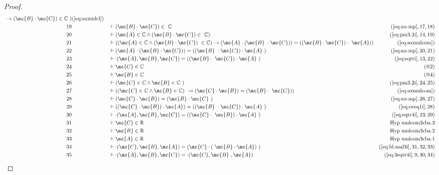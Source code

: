 \begin{proof}
\begin{align}
     ~\rightarrow ( \mc{B} \cdot \mc{C} ) \in \mathbb{C}
     ~)&(\mbox{\ref{eq:axmulcl}})\notag
  \\ 19 &&  & \vdash ( \mc{B} \cdot \mc{C} ) \in
     ~\mathbb{C}&(\mbox{\ref{eq:ax-mp}},17,18)\notag
  \\ 20 &&  & \vdash ( \mc{A} \in \mathbb{C} \wedge ( \mc{B} \cdot \mc{C} ) \in
     ~\mathbb{C} )&(\mbox{\ref{eq:pm3.2i}},14,19)\notag
  \\ 21 &&  & \vdash ( ( \mc{A} \in \mathbb{C} \wedge ( \mc{B} \cdot \mc{C} )
     ~\in \mathbb{C} ) \rightarrow ( \mc{A} \cdot ( \mc{B}
     ~\cdot \mc{C} ) ) = ( ( \mc{B} \cdot \mc{C} ) \cdot
     ~\mc{A} ) )&(\mbox{\ref{eq:axmulcom}})\notag
  \\ 22 &&  & \vdash ( \mc{A} \cdot ( \mc{B} \cdot \mc{C} ) ) = ( ( \mc{B}
     ~\cdot \mc{C} ) \cdot \mc{A}
     ~)&(\mbox{\ref{eq:ax-mp}},20,21)\notag
  \\ 23 &&  & \vdash \cdot( \mc{A} , \mc{B} , \mc{C} ) = ( ( \mc{B} \cdot
     ~\mc{C} ) \cdot \mc{A}
     ~)&(\mbox{\ref{eq:eqtri}},13,22)\notag
  \\ 24 &&  & \vdash \mc{C} \in \mathbb{C}&(@2)\notag
  \\ 25 &&  & \vdash \mc{B} \in \mathbb{C}&(@4)\notag
  \\ 26 &&  & \vdash ( \mc{C} \in \mathbb{C} \wedge \mc{B} \in \mathbb{C}
     ~)&(\mbox{\ref{eq:pm3.2i}},24,25)\notag
  \\ 27 &&  & \vdash ( ( \mc{C} \in \mathbb{C} \wedge \mc{B} \in \mathbb{C} )
     ~\rightarrow ( \mc{C} \cdot \mc{B} ) = ( \mc{B} \cdot
     ~\mc{C} ) )&(\mbox{\ref{eq:axmulcom}})\notag
  \\ 28 &&  & \vdash ( \mc{C} \cdot \mc{B} ) = ( \mc{B} \cdot \mc{C}
     ~)&(\mbox{\ref{eq:ax-mp}},26,27)\notag
  \\ 29 &&  & \vdash ( ( \mc{C} \cdot \mc{B} ) \cdot \mc{A} ) = ( ( \mc{B}
     ~\cdot \mc{C} ) \cdot \mc{A}
     ~)&(\mbox{\ref{eq:oveq1i}},28)\notag
  \\ 30 &&  & \vdash \cdot( \mc{A} , \mc{B} , \mc{C} ) = ( ( \mc{C} \cdot
     ~\mc{B} ) \cdot \mc{A}
     ~)&(\mbox{\ref{eq:eqtr4i}},23,29)\notag
  \\ 31 &&  & \vdash \mc{C} \in
\mathbb{R}&\text{Hyp~mulcom3cba.3}\notag%
  \\ 32 &&  & \vdash \mc{B} \in
\mathbb{R}&\text{Hyp~mulcom3cba.2}\notag%
  \\ 33 &&  & \vdash \mc{A} \in
\mathbb{R}&\text{Hyp~mulcom3cba.1}\notag%
  \\ 34 &&  & \vdash \cdot( \mc{C} , \mc{B} , \mc{A} ) = ( \mc{C} \cdot (
     ~\mc{B} \cdot \mc{A} )
     ~)&(\mbox{\ref{eq:bl.mul3i}},31,32,33)\notag
  \\ 35 &&  & \vdash \cdot( \mc{A} , \mc{B} , \mc{C} ) = \cdot( \mc{C} , \mc{B}
     ~, \mc{A} )&(\mbox{\ref{eq:3eqtr4i}},9,30,34)\notag
\end{align}
\end{proof}

